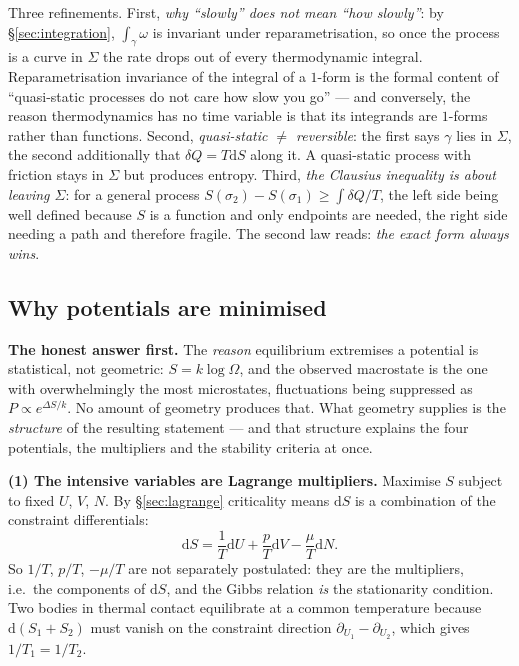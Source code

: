 \documentclass[10pt,a4paper]{article}
\newcommand{\dd}{\mathrm{d}}
\theoremstyle{plain}
\theoremstyle{definition}
\numberwithin{equation}{section}
\begin{document}
\noindent Three refinements. First, \emph{why ``slowly'' does not mean ``how slowly''}: by
\S\ref{sec:integration}, $\int_\gamma\omega$ is invariant under reparametrisation, so once the
process is a curve in $\Sigma$ the rate drops out of every thermodynamic integral.
Reparametrisation invariance of the integral of a $1$-form is the formal content of
``quasi-static processes do not care how slow you go'' --- and conversely, the reason
thermodynamics has no time variable is that its integrands are $1$-forms rather than functions.
Second, \emph{quasi-static $\ne$ reversible}: the first says $\gamma$ lies in $\Sigma$, the
second additionally that $\delta Q=T\dd S$ along it. A quasi-static process with friction stays
in $\Sigma$ but produces entropy. Third, \emph{the Clausius inequality is about leaving
$\Sigma$}: for a general process $S(\sigma_2)-S(\sigma_1)\ge\int\delta Q/T$, the left side being
well defined because $S$ is a function and only endpoints are needed, the right side needing a
path and therefore fragile. The second law reads: \emph{the exact form always wins}.

\subsection{Why potentials are minimised}
\label{sec:minim}

\begin{keybox}
\textbf{The honest answer first.} The \emph{reason} equilibrium extremises a potential is
statistical, not geometric: $S=k\log\Omega$, and the observed macrostate is the one with
overwhelmingly the most microstates, fluctuations being suppressed as
$P\propto e^{\Delta S/k}$. No amount of geometry produces that. What geometry supplies is the
\emph{structure} of the resulting statement --- and that structure explains the four potentials,
the multipliers and the stability criteria at once.
\end{keybox}

\noindent \textbf{(1) The intensive variables are Lagrange multipliers.} Maximise $S$ subject to
fixed $U$, $V$, $N$. By \S\ref{sec:lagrange} criticality means $\dd S$ is a combination of the
constraint differentials:
\begin{equation}
\dd S=\frac1T\dd U+\frac pT\dd V-\frac\mu T\dd N .
\label{eq:lagmult}
\end{equation}
So $1/T$, $p/T$, $-\mu/T$ are not separately postulated: they are the multipliers, i.e.\ the
components of $\dd S$, and the Gibbs relation \emph{is} the stationarity condition. Two bodies
in thermal contact equilibrate at a common temperature because $\dd(S_1+S_2)$ must vanish on the
constraint direction $\partial_{U_1}-\partial_{U_2}$, which gives $1/T_1=1/T_2$.
\end{document}
